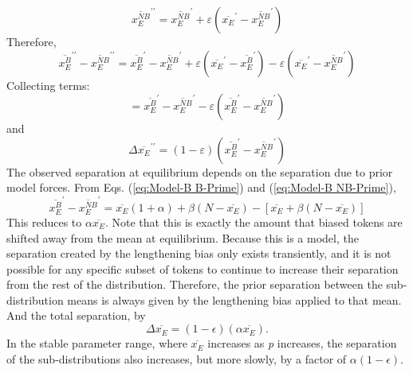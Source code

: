\begin{equation}
\overline{x_{E}^{NB}}^{\prime\prime}=\overline{x_{E}^{NB}}^{\prime}+\varepsilon\left(\overline{x_{E}}^{\prime}-\overline{x_{E}^{NB}}^{\prime}\right)
\end{equation}
Therefore, 
\begin{equation}
\overline{x_{E}^{B}}^{\prime\prime}-\overline{x_{E}^{NB}}^{\prime\prime}=\overline{x_{E}^{B}}^{\prime}-\overline{x_{E}^{NB}}^{\prime}+\varepsilon\left(\overline{x_{E}}^{\prime}-\overline{x_{E}^{B}}^{\prime}\right)-\varepsilon\left(\overline{x_{E}}^{\prime}-\overline{x_{E}^{NB}}^{\prime}\right)
\end{equation}
Collecting terms:
\begin{equation}
=\overline{x_{E}^{B}}^{\prime}-\overline{x_{E}^{NB}}^{\prime}-\varepsilon\left(\overline{x_{E}^{B}}^{\prime}-\overline{x_{E}^{NB}}^{\prime}\right)
\end{equation}
and
\begin{equation}
\varDelta\overline{x_{E}}^{\prime\prime}=(1-\varepsilon)\left(\overline{x_{E}^{B}}^{\prime}-\overline{x_{E}^{NB}}^{\prime}\right)
\end{equation}
The observed separation at equilibrium depends on the separation due
to prior model forces. From Eqs. (\ref{eq:Model-B B-Prime}) and (\ref{eq:Model-B NB-Prime}), 
\begin{equation}
\overline{x_{E}^{B}}^{\prime}-\overline{x_{E}^{NB}}^{\prime}=\overline{x_{E}}(1+\alpha)+\beta(N-\overline{x_{E}})-[\overline{x_{E}}+\beta(N-\overline{x_{E}})]
\end{equation}
This reduces to $\alpha\overline{x_{E}}$. Note that this is exactly
the amount that biased tokens are shifted away from the mean at equilibrium.
Because this is a  model, the separation created by
the lengthening bias only exists transiently, and it is not possible
for any specific subset of tokens to continue to increase their separation
from the rest of the distribution. Therefore, the prior separation
between the sub-distribution means is always given by the lengthening
bias applied to that mean. And the total separation, by 
\begin{equation}
\varDelta\overline{x_{E}}=(1-\epsilon)(\alpha\overline{x_{E}}).\label{eq:Cat Sep-1}
\end{equation}
In the stable parameter range, where $\overline{x_{E}}$ increases
as \emph{p} increases, the separation of the sub-distributions also
increases, but more slowly, by a factor of $\alpha(1-\epsilon)$.

